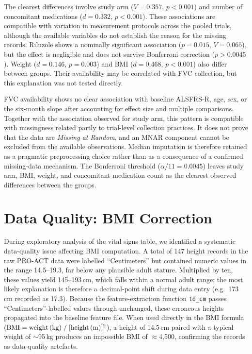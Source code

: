 The clearest differences involve study arm ($V\!=\!0.357$, $p < 0.001$) and number of concomitant medications ($d\!=\!0.332$, $p < 0.001$). These associations are compatible with variation in measurement protocols across the pooled trials, although the available variables do not establish the reason for the missing records.
Riluzole shows a nominally significant association ($p\!=\!0.015$, $V\!=\!0.065$), but the effect is negligible and does not survive Bonferroni correction ($p > 0.0045$).
Weight ($d\!=\!0.146$, $p\!=\!0.003$) and BMI ($d\!=\!0.468$, $p < 0.001$) also differ between groups. Their availability may be correlated with FVC collection, but this explanation was not tested directly.

FVC availability shows no clear association with baseline ALSFRS-R, age, sex, or the six-month slope after accounting for effect size and multiple comparisons. Together with the association observed for study arm, this pattern is compatible with missingness related partly to trial-level collection practices. It does not prove that the data are \emph{Missing at Random}, and an \gls{MNAR} component cannot be excluded from the available observations.
Median imputation is therefore retained as a pragmatic preprocessing choice rather than as a consequence of a confirmed missing-data mechanism. The Bonferroni threshold ($\alpha/11\!=\!0.0045$) leaves study arm, BMI, weight, and concomitant-medication count as the clearest observed differences between the groups.


\section{Data Quality: BMI Correction}
\label{sec:results_bmi_fix}

During exploratory analysis of the vital signs table, we identified a systematic data-quality issue affecting \gls{BMI} computation.
A total of 147 height records in the raw PRO-ACT data were labelled ``Centimeters'' but contained numeric values in the range 14.5--19.3, far below any plausible adult stature.
Multiplied by ten, these values yield 145--193\,cm, which falls within a normal adult range; the most likely explanation is therefore a decimal-point shift during data entry (e.g.\ 173\,cm recorded as 17.3).
Because the feature-extraction function \texttt{to\_cm} passes ``Centimeters''-labelled values through unchanged, these erroneous heights propagated into the baseline feature file.
When used directly in the \gls{BMI} formula ($\text{BMI} = \text{weight\,(kg)} \;/\; [\text{height\,(m)}]^{2}$), a height of 14.5\,cm paired with a typical weight of ${\sim}$95\,kg produces an impossible \gls{BMI} of ${\approx}$4{,}500, confirming the records as data-quality artefacts.

